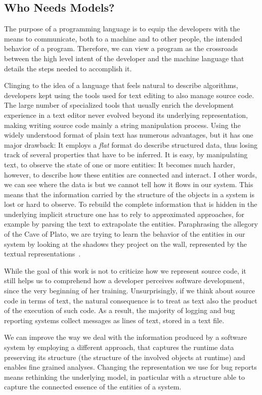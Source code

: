 \subsection{Who Needs Models?}

The purpose of a programming language is to equip the developers with the means to communicate, both to a machine and to other people, the intended behavior of a program.
Therefore, we can view a program  as the crossroads between the high level intent of the developer and the machine language that details the steps needed to accomplish it.

Clinging to the idea of a language that feels natural to describe algorithms, developers kept using the tools used for text editing to also manage source code.
The large number of specialized tools that usually enrich the development experience in a text editor never evolved beyond its underlying representation, making writing source code mainly a string manipulation process.
Using the widely understood format of plain text has numerous advantages, but it has one major drawback: It employs a \emph{flat} format do describe structured data, thus losing track of several properties that have to be inferred.
It is easy, by manipulating text, to observe the state of one or more entities: It becomes much harder, however, to describe how these entities are connected and interact.
I other words, we can see where the data is but we cannot tell how it flows in our system.
This means that the information carried by the structure of the objects in a system is lost or hard to observe.
To rebuild the complete information that is hidden in the underlying implicit structure one has to rely to approximated approaches, for example by parsing the text to extrapolate the entities.
Paraphrasing the allegory of the Cave of Plato, we are trying to learn the behavior of the entities in our system by looking at the shadows they project on the wall, represented by the textual representations~\cite{Plato380a}.

While the goal of this work is not to criticize how we represent source code, it still helps us to comprehend how a developer perceives software development, since the very beginning of her training.
Unsurprisingly, if we think about source code in terms of text, the natural consequence is to treat as text also the product of the execution of such code.
As a result, the majority of logging and bug reporting systems collect messages as lines of text, stored in a text file.

We can improve the way we deal with the information produced by a software system by employing a different approach, that captures the runtime data preserving its structure (\eg the structure of the involved objects at runtime) and enables fine grained analyses.
Changing the representation we use for bug reports means rethinking the underlying model, in particular with a structure able to capture the connected essence of the entities of a system.

